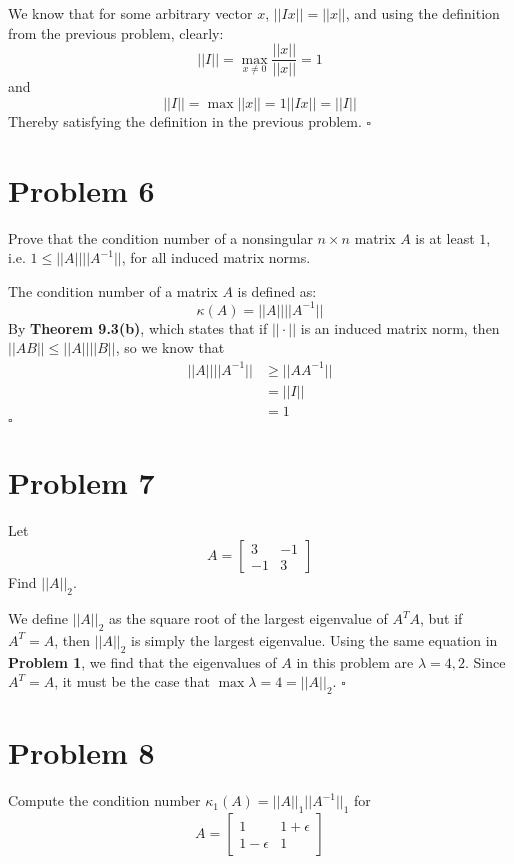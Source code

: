 \documentclass[11pt]{article}
\newenvironment{proof}{\noindent{\bf Proof.}}{\hfill $\square$\medskip}
\begin{document}
\begin{proof}
We know that for some arbitrary vector $x$, $||Ix||=||x||$, and using the definition from 
the previous problem, clearly:
$$||I||=\max_{x\neq0}\frac{||x||}{||x||}=1$$
and
$$||I||=\max{||x||=1}||Ix||=||I||$$
Thereby satisfying the definition in the previous problem.
\end{proof}


\section{Problem 6}
Prove that the condition number of a nonsingular $n\times n$ matrix $A$ is at least $1$, i.e. $1\leq||A||||A^{-1}||$, for all induced matrix norms.

\begin{proof}
The condition number of a matrix $A$ is defined as:
$$\kappa(A)=||A||||A^{-1}||$$
By \textbf{Theorem 9.3(b)}, which states that if $||\cdot||$ is an induced matrix norm, then 
$||AB||\leq||A||||B||$, so we know that
\begin{equation}
    \begin{split}
        ||A||||A^{-1}||&\geq||AA^{-1}||\\
        &=||I||\\
        &=1
    \end{split}
\end{equation}
\end{proof}


\section{Problem 7}
Let
$$A=\begin{bmatrix}
        3  & -1 \\
        -1 & 3
    \end{bmatrix}$$
Find $||A||_{2}$.

\begin{proof}
We define $||A||_{2}$ as the square root of the largest eigenvalue of $A^{T}A$, but if $A^{T}=A$, then 
$||A||_{2}$ is simply the largest eigenvalue. Using the same equation in \textbf{Problem 1}, we find
that the eigenvalues of $A$ in this problem are $\lambda=4,2$. Since $A^{T}=A$, it must be the case that
$\max\lambda=4=||A||_{2}$.
\end{proof}


\section{Problem 8}
Compute the condition number $\kappa_{1}(A)=||A||_{1}||A^{-1}||_{1}$ for
$$A=\begin{bmatrix}
        1          & 1+\epsilon \\
        1-\epsilon & 1
    \end{bmatrix}$$
\end{document}
